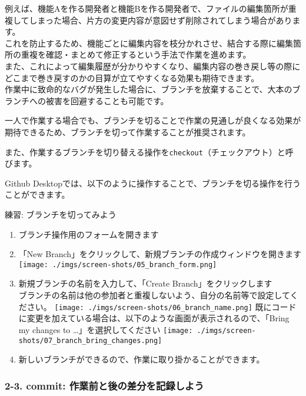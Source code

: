 例えば、機能Aを作る開発者と機能Bを作る開発者で、ファイルの編集箇所が重複してしまった場合、片方の変更内容が意図せず削除されてしまう場合があります。\\
これを防止するため、機能ごとに編集内容を枝分かれさせ、結合する際に編集箇所の重複を確認・まとめて修正するという手法で作業を進めます。\\
また、これによって編集履歴が分かりやすくなり、編集内容の巻き戻し等の際にどこまで巻き戻すのかの目算が立てやすくなる効果も期待できます。\\
作業中に致命的なバグが発生した場合に、ブランチを放棄することで、大本のブランチへの被害を回避することも可能です。

一人で作業する場合でも、ブランチを切ることで作業の見通しが良くなる効果が期待できるため、ブランチを切って作業することが推奨されます。

また、作業するブランチを切り替える操作を\texttt{checkout}（チェックアウト）と呼びます。

Github
Desktopでは、以下のように操作することで、ブランチを切る操作を行うことができます。

練習: ブランチを切ってみよう

\begin{enumerate}
\def\labelenumi{\arabic{enumi}.}
\item
  ブランチ操作用のフォームを開きます
\item
  「New Branch」をクリックして、新規ブランチの作成ウィンドウを開きます
  \texttt{[image: ./imgs/screen-shots/05\_branch\_form.png]}
\item
  新規ブランチの名前を入力して、「Create Branch」をクリックします\\
  ブランチの名前は他の参加者と重複しないよう、自分の名前等で設定してください。
  \texttt{[image: ./imgs/screen-shots/06\_branch\_name.png]}
  既にコードに変更を加えている場合は、以下のような画面が表示されるので、「Bring
  my changes to \ldots」を選択してください
  \texttt{[image: ./imgs/screen-shots/07\_branch\_bring\_changes.png]}
\item
  新しいブランチができるので、作業に取り掛かることができます。
\end{enumerate}

\subsubsection{\texorpdfstring{2-3. commit:
作業前と後の\textbf{差分を記録}しよう}{2-3. commit: 作業前と後の差分を記録しよう}}\label{commit-ux4f5cux696dux524dux3068ux5f8cux306eux5deeux5206ux3092ux8a18ux9332ux3057ux3088ux3046}

